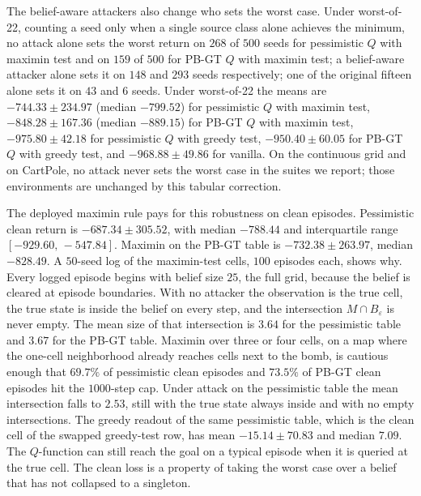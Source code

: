 \documentclass[10pt,twocolumn]{article}
\begin{document}
The belief-aware attackers also change who sets the worst case.
Under worst-of-22, counting a seed only when a single source class alone achieves the minimum, no attack alone sets the worst return on $268$ of $500$ seeds for pessimistic $Q$ with maximin test and on $159$ of $500$ for PB-GT $Q$ with maximin test; a belief-aware attacker alone sets it on $148$ and $293$ seeds respectively; one of the original fifteen alone sets it on $43$ and $6$ seeds.
Under worst-of-22 the means are $-744.33{\pm}234.97$ (median $-799.52$) for pessimistic $Q$ with maximin test, $-848.28{\pm}167.36$ (median $-889.15$) for PB-GT $Q$ with maximin test, $-975.80{\pm}42.18$ for pessimistic $Q$ with greedy test, $-950.40{\pm}60.05$ for PB-GT $Q$ with greedy test, and $-968.88{\pm}49.86$ for vanilla.
On the continuous grid and on CartPole, no attack never sets the worst case in the suites we report; those environments are unchanged by this tabular correction.

The deployed maximin rule pays for this robustness on clean episodes.
Pessimistic clean return is $-687.34{\pm}305.52$, with median $-788.44$ and interquartile range $[-929.60,\,-547.84]$.
Maximin on the PB-GT table is $-732.38{\pm}263.97$, median $-828.49$.
A $50$-seed log of the maximin-test cells, $100$ episodes each, shows why.
Every logged episode begins with belief size $25$, the full grid, because the belief is cleared at episode boundaries.
With no attacker the observation is the true cell, the true state is inside the belief on every step, and the intersection $M\cap B_\varepsilon$ is never empty.
The mean size of that intersection is $3.64$ for the pessimistic table and $3.67$ for the PB-GT table.
Maximin over three or four cells, on a map where the one-cell neighborhood already reaches cells next to the bomb, is cautious enough that $69.7\%$ of pessimistic clean episodes and $73.5\%$ of PB-GT clean episodes hit the $1000$-step cap.
Under attack on the pessimistic table the mean intersection falls to $2.53$, still with the true state always inside and with no empty intersections.
The greedy readout of the same pessimistic table, which is the clean cell of the swapped greedy-test row, has mean $-15.14{\pm}70.83$ and median $7.09$.
The $Q$-function can still reach the goal on a typical episode when it is queried at the true cell.
The clean loss is a property of taking the worst case over a belief that has not collapsed to a singleton.
\end{document}
